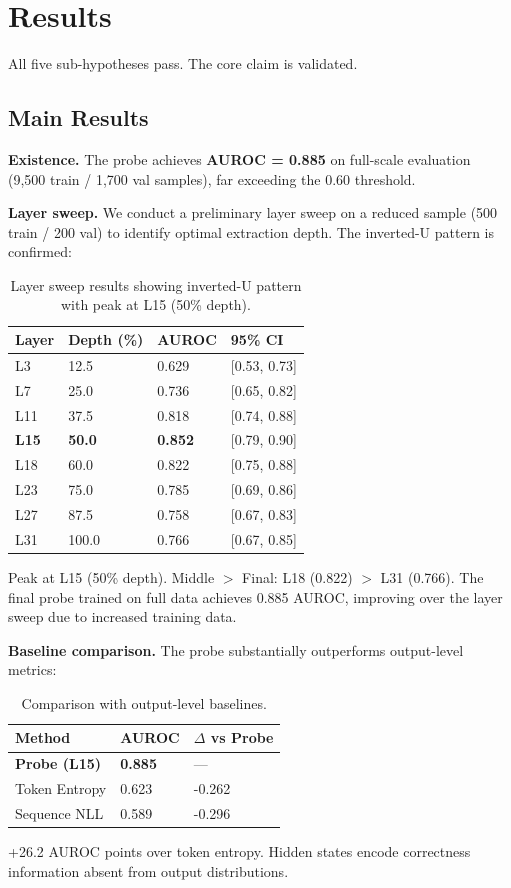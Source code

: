 \section{Results}

All five sub-hypotheses pass. The core claim is validated.

\subsection{Main Results}

\textbf{Existence.} The probe achieves \textbf{AUROC = 0.885} on full-scale evaluation (9,500 train / 1,700 val samples), far exceeding the 0.60 threshold.

\textbf{Layer sweep.} We conduct a preliminary layer sweep on a reduced sample (500 train / 200 val) to identify optimal extraction depth. The inverted-U pattern is confirmed:

\begin{table}[h]
\centering
\begin{tabular}{llll}
\toprule
Layer & Depth (\%) & AUROC & 95\% CI \\
\midrule
L3    & 12.5      & 0.629 & [0.53, 0.73] \\
L7    & 25.0      & 0.736 & [0.65, 0.82] \\
L11   & 37.5      & 0.818 & [0.74, 0.88] \\
\textbf{L15}   & \textbf{50.0}      & \textbf{0.852} & [0.79, 0.90] \\
L18   & 60.0      & 0.822 & [0.75, 0.88] \\
L23   & 75.0      & 0.785 & [0.69, 0.86] \\
L27   & 87.5      & 0.758 & [0.67, 0.83] \\
L31   & 100.0     & 0.766 & [0.67, 0.85] \\
\bottomrule
\end{tabular}
\caption{Layer sweep results showing inverted-U pattern with peak at L15 (50\% depth).}
\label{tab:layer-sweep}
\end{table}

Peak at L15 (50\% depth). Middle $>$ Final: L18 (0.822) $>$ L31 (0.766). The final probe trained on full data achieves 0.885 AUROC, improving over the layer sweep due to increased training data.

\textbf{Baseline comparison.} The probe substantially outperforms output-level metrics:

\begin{table}[h]
\centering
\begin{tabular}{lll}
\toprule
Method & AUROC & $\Delta$ vs Probe \\
\midrule
\textbf{Probe (L15)} & \textbf{0.885} & --- \\
Token Entropy & 0.623 & -0.262 \\
Sequence NLL & 0.589 & -0.296 \\
\bottomrule
\end{tabular}
\caption{Comparison with output-level baselines.}
\label{tab:baselines}
\end{table}

+26.2 AUROC points over token entropy. Hidden states encode correctness information absent from output distributions.
